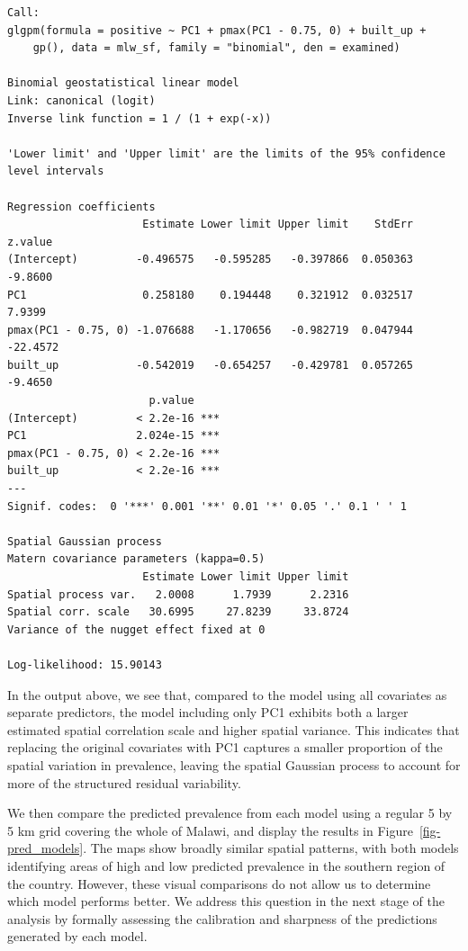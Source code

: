 \documentclass[
  letterpaper,
]{krantz}
\begin{document}
\begin{verbatim}
Call:
glgpm(formula = positive ~ PC1 + pmax(PC1 - 0.75, 0) + built_up + 
    gp(), data = mlw_sf, family = "binomial", den = examined)

Binomial geostatistical linear model
Link: canonical (logit) 
Inverse link function = 1 / (1 + exp(-x)) 
 
'Lower limit' and 'Upper limit' are the limits of the 95% confidence level intervals

Regression coefficients
                     Estimate Lower limit Upper limit    StdErr  z.value
(Intercept)         -0.496575   -0.595285   -0.397866  0.050363  -9.8600
PC1                  0.258180    0.194448    0.321912  0.032517   7.9399
pmax(PC1 - 0.75, 0) -1.076688   -1.170656   -0.982719  0.047944 -22.4572
built_up            -0.542019   -0.654257   -0.429781  0.057265  -9.4650
                      p.value    
(Intercept)         < 2.2e-16 ***
PC1                 2.024e-15 ***
pmax(PC1 - 0.75, 0) < 2.2e-16 ***
built_up            < 2.2e-16 ***
---
Signif. codes:  0 '***' 0.001 '**' 0.01 '*' 0.05 '.' 0.1 ' ' 1

Spatial Gaussian process
Matern covariance parameters (kappa=0.5)
                     Estimate Lower limit Upper limit
Spatial process var.   2.0008      1.7939      2.2316
Spatial corr. scale   30.6995     27.8239     33.8724
Variance of the nugget effect fixed at 0

Log-likelihood: 15.90143
\end{verbatim}

In the output above, we see that, compared to the model using all
covariates as separate predictors, the model including only PC1 exhibits
both a larger estimated spatial correlation scale and higher spatial
variance. This indicates that replacing the original covariates with PC1
captures a smaller proportion of the spatial variation in prevalence,
leaving the spatial Gaussian process to account for more of the
structured residual variability.

We then compare the predicted prevalence from each model using a regular
5 by 5 km grid covering the whole of Malawi, and display the results in
Figure~\ref{fig-pred_models}. The maps show broadly similar spatial
patterns, with both models identifying areas of high and low predicted
prevalence in the southern region of the country. However, these visual
comparisons do not allow us to determine which model performs better. We
address this question in the next stage of the analysis by formally
assessing the calibration and sharpness of the predictions generated by
each model.
\end{document}
